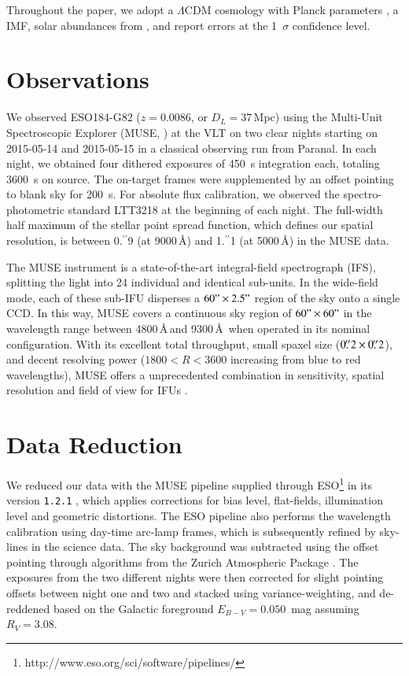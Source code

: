 \documentclass[traditabstract]{aa}
\newcommand{\farc}{\hbox{$.\!\!^{\prime\prime}$}}
\begin{document}
Throughout the paper, we adopt a $\Lambda$CDM cosmology with Planck parameters \citep{2014A&A...571A..16P}, a \citet{2003PASP..115..763C} IMF, solar abundances from \citet{2009ARA&A..47..481A}, and report errors at the 1~$\sigma$ confidence level.

\section{Observations}

We observed ESO184-G82 ($z=0.0086$, or $D_L=37$\,Mpc) using the Multi-Unit Spectroscopic Explorer (MUSE, \citealp{2010SPIE.7735E..08B}) at the VLT on two clear nights starting on 2015-05-14 and 2015-05-15 in a classical observing run from Paranal. In each night, we obtained four dithered exposures of 450~s integration each, totaling 3600~s on source. The on-target frames were supplemented by an offset pointing to blank sky for 200~s. For absolute flux calibration, we observed the spectro-photometric standard LTT3218 at the beginning of each night. The full-width half maximum of the stellar point spread function, which defines our spatial resolution, is between 0\farc{9} (at 9000\,\AA) and 1\farc{1} (at 5000\,\AA) in the MUSE data.

The MUSE instrument is a state-of-the-art integral-field spectrograph (IFS), splitting the light into 24 individual and identical sub-units. In the wide-field mode, each of these sub-IFU disperses a $60"\times 2.5"$ region of the sky onto a single CCD. In this way, MUSE covers a continuous sky region of $60"\times 60"$ in the wavelength range between 4800\,\AA\,and 9300\,\AA\, when operated in its nominal configuration. With its excellent total throughput, small spaxel size ($0\farc{2} \times 0\farc{2}$), and decent resolving power ($1800 < R < 3600$ increasing from blue to red wavelengths), MUSE offers a unprecedented combination in sensitivity, spatial resolution and field of view for IFUs \citep{2010SPIE.7735E..08B}.

\section{Data Reduction}

We reduced our data with the MUSE pipeline supplied through ESO\footnote{http://www.eso.org/sci/software/pipelines/} in its version \texttt{1.2.1} \citep{2014ASPC..485..451W}, which applies corrections for bias level, flat-fields, illumination level and geometric distortions. The ESO pipeline also performs the wavelength calibration using day-time arc-lamp frames, which is subsequently refined by sky-lines in the science data. The sky background was subtracted using the offset pointing through algorithms from the Zurich Atmospheric Package \citep{2016MNRAS.458.3210S}. The exposures from the two different nights were then corrected for slight pointing offsets between night one and two and stacked using variance-weighting, and de-reddened based on the Galactic foreground $E_{B-V}=0.050$~mag \citep{2011ApJ...737..103S} assuming $R_V=3.08$. 
\end{document}
